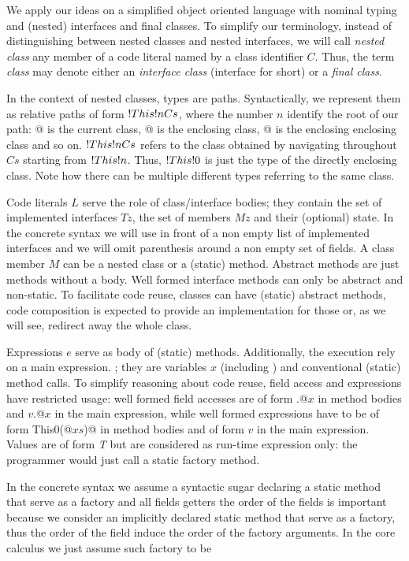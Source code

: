 We apply our ideas on a simplified object oriented language with nominal typing and (nested)
interfaces  and final classes.
To simplify our terminology, instead of distinguishing between 
nested classes and nested interfaces, we will call \emph{nested class} any member of a code literal 
named by a class identifier $C$. Thus, the term \emph{class} may denote either an \emph{interface class} (interface for short) or a \emph{final class}.

In the context of nested classes, types are paths. Syntactically,
we represent them as relative paths of form 
$\This{n}{Cs}$, where the number $n$ identify the root of our path:
@ is the current class, @ is the enclosing class, @ is the enclosing enclosing class and so on. $\This{n}{Cs}$
refers to the class obtained by navigating throughout  $Cs$ starting from $\This{n}$.
Thus, $\This{0}$ is just the type of the directly enclosing class.
Note how there can be multiple different types referring to the same class.

Code literals $L$
serve the role of class/interface bodies; they contain the set of implemented interfaces
$Tz$, the set of members $Mz$ and their (optional) state.
In the concrete syntax we will use \Q@implements@ in front of a non empty list of implemented interfaces
and we will omit parenthesis around a non empty set of fields.
A class member $M$ can be a nested class or a (static) method.
Abstract methods are just methods without a body. 
Well formed interface methods can only be abstract and non-static.
To facilitate code reuse, classes can have (static) abstract methods, code composition is expected to 
provide an implementation for those or, as we will see, redirect away the whole class.

Expressions $e$ serve as body of (static) methods. Additionally, the execution rely on a main expression.
; they
 are variables $x$ (including \Q@this@)
and conventional (static) method calls.
To simplify reasoning about code reuse, field access and \Q@new@ expressions have restricted usage:
well formed field accesses are of form \Q@this.@$x$ in method bodies and
$v$\Q@.@$x$  in the main expression, while 
well formed \Q@new@ expressions have to be of form \Q@new This0(@$xs$\Q@)@ in method bodies
and of form $v$ in the main expression.
Values are of form \textit{ T} but are considered as run-time expression only: the programmer would just call a static factory method.


In the concrete syntax we assume a syntactic sugar declaring
a static \Q@of@ method that serve as a factory and all fields getters
the order of the fields is important because we consider
an implicitly declared static \Q@of@ method that serve as a factory, thus the order of the field induce the order of the factory arguments. In the core calculus we just assume such factory to be 



